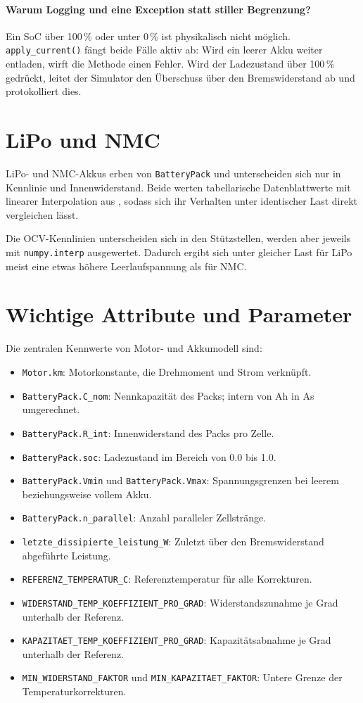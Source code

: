 \paragraph{Warum Logging und eine Exception statt stiller Begrenzung?} Ein SoC über 100\,\% oder unter 0\,\% ist physikalisch nicht möglich. \texttt{apply\_current()} fängt beide Fälle aktiv ab: Wird ein leerer Akku weiter entladen, wirft die Methode einen Fehler. Wird der Ladezustand über 100\,\% gedrückt, leitet der Simulator den Überschuss über den Bremswiderstand ab und protokolliert dies.

\section{LiPo und NMC}

LiPo- und NMC-Akkus erben von \texttt{BatteryPack} und unterscheiden sich nur in Kennlinie und Innenwiderstand. Beide werten tabellarische Datenblattwerte mit linearer Interpolation aus \cite{numpy_docs}, sodass sich ihr Verhalten unter identischer Last direkt vergleichen lässt.

Die OCV-Kennlinien unterscheiden sich in den Stützstellen, werden aber jeweils mit \texttt{numpy.interp} ausgewertet. Dadurch ergibt sich unter gleicher Last für LiPo meist eine etwas höhere Leerlaufspannung als für NMC.

\section{Wichtige Attribute und Parameter}

Die zentralen Kennwerte von Motor- und Akkumodell sind:

\begin{itemize}
\item \texttt{Motor.km}: Motorkonstante, die Drehmoment und Strom verknüpft.
\item \texttt{BatteryPack.C\_nom}: Nennkapazität des Packs; intern von Ah in As umgerechnet.
\item \texttt{BatteryPack.R\_int}: Innenwiderstand des Packs pro Zelle.
\item \texttt{BatteryPack.soc}: Ladezustand im Bereich von 0.0 bis 1.0.
\item \texttt{BatteryPack.Vmin} und \texttt{BatteryPack.Vmax}: Spannungsgrenzen bei leerem beziehungsweise vollem Akku.
\item \texttt{BatteryPack.n\_parallel}: Anzahl paralleler Zellstränge.
\item \texttt{letzte\_dissipierte\_leistung\_W}: Zuletzt über den Bremswiderstand abgeführte Leistung.
\item \texttt{REFERENZ\_TEMPERATUR\_C}: Referenztemperatur für alle Korrekturen.
\item \texttt{WIDERSTAND\_TEMP\_KOEFFIZIENT\_PRO\_GRAD}: Widerstandszunahme je Grad unterhalb der Referenz.
\item \texttt{KAPAZITAET\_TEMP\_KOEFFIZIENT\_PRO\_GRAD}: Kapazitätsabnahme je Grad unterhalb der Referenz.
\item \texttt{MIN\_WIDERSTAND\_FAKTOR} und \texttt{MIN\_KAPAZITAET\_FAKTOR}: Untere Grenze der Temperaturkorrekturen.
\end{itemize}

